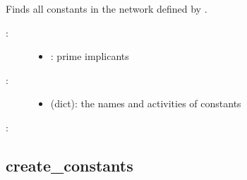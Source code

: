 \documentclass[letterpaper,10pt,english]{sphinxmanual}
\begin{document}
\begin{fulllineitems}
\label{\detokenize{PrimeImplicants:PyBoolNet.PrimeImplicants.find_constants}}
Finds all constants in the network defined by .
\begin{description}
\item[{:}] \leavevmode\begin{itemize}
\item {} 
: prime implicants

\end{itemize}

\item[{:}] \leavevmode\begin{itemize}
\item {} 
 (dict): the names and activities of constants

\end{itemize}

\end{description}

:

\begin{sphinxVerbatim}[commandchars=\\\{\}]
\end{sphinxVerbatim}

\end{fulllineitems}



\subsection{create\_constants}
\label{\detokenize{PrimeImplicants:id6}}\label{\detokenize{PrimeImplicants:create-constants}}
\end{document}
